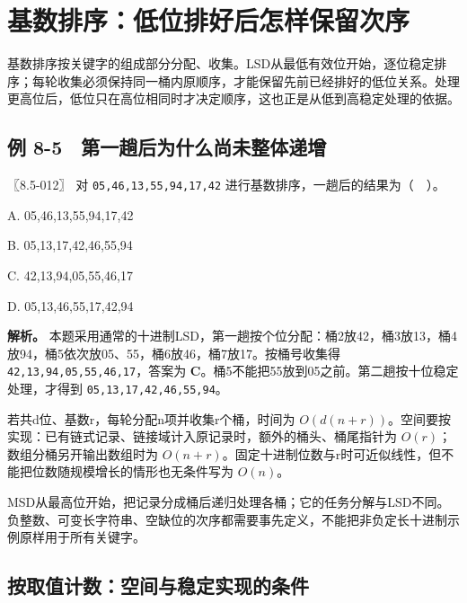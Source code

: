 \section{基数排序：低位排好后怎样保留次序}\label{DS08-09}

基数排序按关键字的组成部分分配、收集。LSD从最低有效位开始，逐位稳定排序；每轮收集必须保持同一桶内原顺序，才能保留先前已经排好的低位关系。处理更高位后，低位只在高位相同时才决定顺序，这也正是从低到高稳定处理的依据。

\subsection{例 8-5　第一趟后为什么尚未整体递增}\label{DS08-ex5}

\begin{example}[配套案例]

〖8.5-012〗 对 \texttt{05,\allowbreak{}46,\allowbreak{}13,\allowbreak{}55,\allowbreak{}94,\allowbreak{}17,\allowbreak{}42} 进行基数排序，一趟后的结果为（　）。

A. 05,46,13,55,94,17,42

B. 05,13,17,42,46,55,94

C. 42,13,94,05,55,46,17

D. 05,13,46,55,17,42,94

\end{example}

\textbf{解析。} 本题采用通常的十进制LSD，第一趟按个位分配：桶2放42，桶3放13，桶4放94，桶5依次放05、55，桶6放46，桶7放17。按桶号收集得 \texttt{42,\allowbreak{}13,\allowbreak{}94,\allowbreak{}05,\allowbreak{}55,\allowbreak{}46,\allowbreak{}17}，答案为 \textbf{C}。桶5不能把55放到05之前。第二趟按十位稳定处理，才得到 \texttt{05,\allowbreak{}13,\allowbreak{}17,\allowbreak{}42,\allowbreak{}46,\allowbreak{}55,\allowbreak{}94}。

若共d位、基数r，每轮分配n项并收集r个桶，时间为 \(O(d(n+r))\)。空间要按实现：已有链式记录、链接域计入原记录时，额外的桶头、桶尾指针为 \(O(r)\)；数组分桶另开输出数组时为 \(O(n+r)\)。固定十进制位数与r时可近似线性，但不能把位数随规模增长的情形也无条件写为 \(O(n)\)。

MSD从最高位开始，把记录分成桶后递归处理各桶；它的任务分解与LSD不同。负整数、可变长字符串、空缺位的次序都需要事先定义，不能把非负定长十进制示例原样用于所有关键字。

\subsection{按取值计数：空间与稳定实现的条件}\label{ux6309ux53d6ux503cux8ba1ux6570ux7a7aux95f4ux4e0eux7a33ux5b9aux5b9eux73b0ux7684ux6761ux4ef6}

